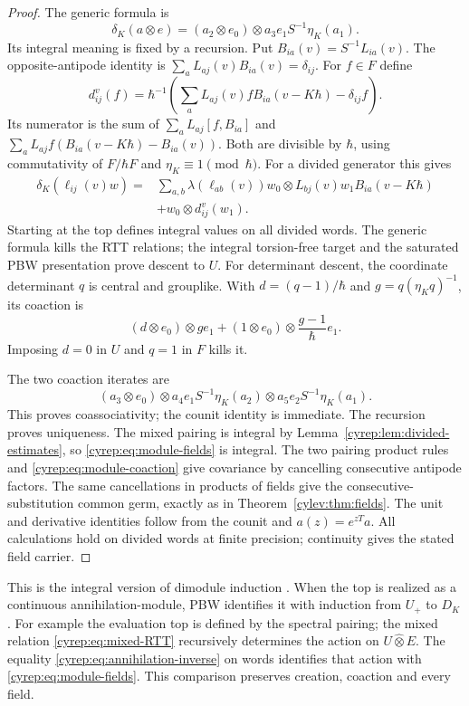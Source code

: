 \begin{proof}
The generic formula is
\[
 \delta_K(a\otimes e)
 =(a_2\otimes e_0)\otimes a_3e_1S^{-1}\eta_K(a_1).
\]
Its integral meaning is fixed by a recursion.
Put \(B_{ia}(v)=S^{-1}L_{ia}(v)\). The opposite-antipode
identity is \(\sum_aL_{aj}(v)B_{ia}(v)=\delta_{ij}\).
For \(f\in F\) define
\[
 d^v_{ij}(f)=\hbar^{-1}
  \left(\sum_aL_{aj}(v)fB_{ia}(v-K\hbar)-\delta_{ij}f\right).
\]
Its numerator is the sum of
\(\sum_aL_{aj}[f,B_{ia}]\) and
\(\sum_aL_{aj}f(B_{ia}(v-K\hbar)-B_{ia}(v))\).
Both are divisible by \(\hbar\), using commutativity of
\(F/\hbar F\) and \(\eta_K\equiv1\pmod\hbar\).
For a divided generator this gives
\[
\begin{split}
 \delta_K(\ell_{ij}(v)w)
 ={}&\sum_{a,b}\lambda(\ell_{ab}(v))w_0\otimes
                   L_{bj}(v)w_1B_{ia}(v-K\hbar)\\
 &+w_0\otimes d^v_{ij}(w_1).
\end{split}
\]
Starting at the top defines integral values on all divided
words. The generic formula kills the RTT relations;
the integral torsion-free target and the saturated PBW
presentation prove descent to \(U\).
For determinant descent, the coordinate determinant \(q\)
is central and grouplike. With \(d=(q-1)/\hbar\) and
\(g=q(\eta_Kq)^{-1}\), its coaction is
\[
 (d\otimes e_0)\otimes ge_1
       +(1\otimes e_0)\otimes\frac{g-1}{\hbar}e_1.
\]
Imposing \(d=0\) in \(U\) and \(q=1\) in \(F\) kills it.

The two coaction iterates are
\[
 (a_3\otimes e_0)\otimes
 a_4e_1S^{-1}\eta_K(a_2)\otimes
 a_5e_2S^{-1}\eta_K(a_1).
\]
This proves coassociativity; the counit identity is immediate.
The recursion proves uniqueness.
The mixed pairing is integral by
Lemma~\ref{cyrep:lem:divided-estimates}, so
\eqref{cyrep:eq:module-fields} is integral.
The two pairing product rules and
\eqref{cyrep:eq:module-coaction} give covariance by
cancelling consecutive antipode factors.
The same cancellations in products of fields give the
consecutive-substitution common germ, exactly as in
Theorem~\ref{cylev:thm:fields}.
The unit and derivative identities follow from the counit
and \(a(z)=e^{zT}a\).
All calculations hold on divided words at finite precision;
continuity gives the stated field carrier.
\end{proof}

This is the integral version of dimodule induction
\cite[Proposition 3.2]{EtingofKazhdanIV}.
When the top is realized as a continuous annihilation-module,
PBW identifies it with induction from \(U_+\) to \(D_K\).
For example the evaluation top is defined by the spectral pairing;
the mixed relation \eqref{cyrep:eq:mixed-RTT} recursively determines
the action on \(U\widehat\otimes E\).
The equality \eqref{cyrep:eq:annihilation-inverse} on words
identifies that action with \eqref{cyrep:eq:module-fields}.
This comparison preserves creation, coaction and every field.

